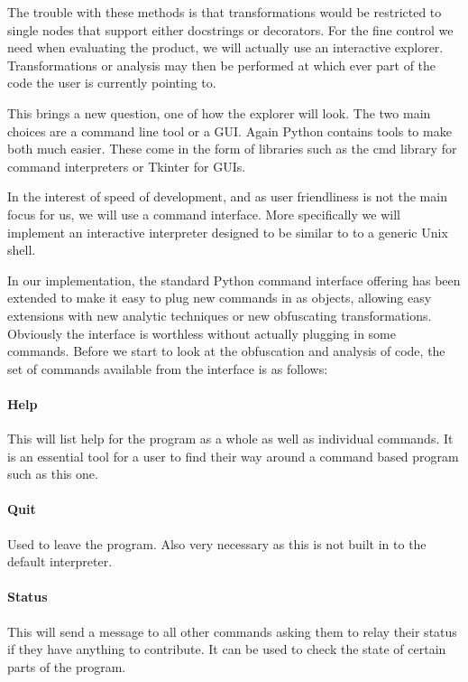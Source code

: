 \documentclass{report}
\begin{document}
The trouble with these methods is that transformations would be restricted to single nodes that support either docstrings or
decorators. For the fine control we need when evaluating the product, we will actually use an interactive explorer.
Transformations or analysis may then be performed at which ever part of the code the user is currently pointing to.

This brings a new question, one of how the explorer will look. The two main choices are a command line tool or a GUI. Again
Python contains tools to make both much easier. These come in the form of libraries such as the cmd library \cite{pycmd} for command
interpreters or Tkinter \cite{pytkinter} for GUIs.

In the interest of speed of development, and as user friendliness is not the main focus for us, we will use a command interface.
More specifically we will implement an interactive interpreter designed to be similar to to a generic Unix shell.

In our implementation, the standard Python command interface offering has been extended to make it easy to plug new commands in as
objects, allowing easy extensions with new analytic techniques or new obfuscating transformations. Obviously the
interface is worthless without actually plugging in some commands. Before we start to look at the obfuscation and analysis of code, the set of commands
available from the interface is as follows:

\paragraph{Help}

This will list help for the program as a whole as well as individual commands. It is an essential tool for a user to find their way around a
command based program such as this one.

\paragraph{Quit}

Used to leave the program. Also very necessary as this is not built in to the default interpreter.

\paragraph{Status}

This will send a message to all other commands asking them to relay their status if they have anything to contribute. It can be
used to check the state of certain parts of the program.
\end{document}
